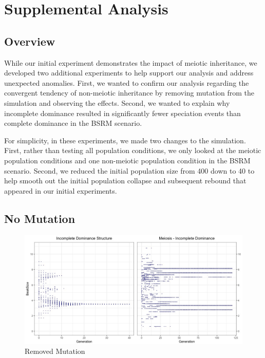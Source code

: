 \documentclass[conference]{IEEEtran}
\begin{document}
\section{Supplemental Analysis}

\subsection{Overview}

While our initial experiment demonstrates the impact of meiotic inheritance, we developed two additional experiments to help support our analysis and address unexpected anomalies. First, we wanted to confirm our analysis regarding the convergent tendency of non-meiotic inheritance by removing mutation from the simulation and observing the effects. Second, we wanted to explain why incomplete dominance resulted in significantly fewer speciation events than complete dominance in the BSRM scenario. 

For simplicity, in these experiments, we made two changes to the simulation. First, rather than testing all population conditions, we only looked at the meiotic population conditions and one non-meiotic population condition in the BSRM scenario. Second, we reduced the initial population size from 400 down to 40 to help smooth out the initial population collapse and subsequent rebound that appeared in our initial experiments.



\subsection{No Mutation}

\begin{figure}[ht]
    \centering
    \includegraphics[width=\linewidth]{Data/EXP4}
    \caption{Removed Mutation}
    \label{fig:EXP4}
\end{figure}
\end{document}
